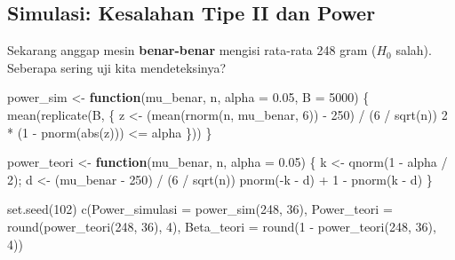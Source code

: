 \documentclass[
  indonesian,
  letterpaper,
]{book}
\newenvironment{Shaded}{\begin{snugshade}}{\end{snugshade}}
\newcommand{\AttributeTok}[1]{\textcolor[rgb]{0.40,0.45,0.13}{#1}}
\newcommand{\ControlFlowTok}[1]{\textcolor[rgb]{0.00,0.23,0.31}{\textbf{#1}}}
\newcommand{\DecValTok}[1]{\textcolor[rgb]{0.68,0.00,0.00}{#1}}
\newcommand{\FloatTok}[1]{\textcolor[rgb]{0.68,0.00,0.00}{#1}}
\newcommand{\FunctionTok}[1]{\textcolor[rgb]{0.28,0.35,0.67}{#1}}
\newcommand{\NormalTok}[1]{\textcolor[rgb]{0.00,0.23,0.31}{#1}}
\newcommand{\OtherTok}[1]{\textcolor[rgb]{0.00,0.23,0.31}{#1}}
\newcommand{\SpecialCharTok}[1]{\textcolor[rgb]{0.37,0.37,0.37}{#1}}
\begin{document}
\subsection{Simulasi: Kesalahan Tipe II dan
Power}\label{simulasi-kesalahan-tipe-ii-dan-power}

Sekarang anggap mesin \textbf{benar-benar} mengisi rata-rata 248 gram
(\(H_0\) salah). Seberapa sering uji kita mendeteksinya?

\begin{Shaded}
\begin{Highlighting}[]
\NormalTok{power\_sim }\OtherTok{\textless{}{-}} \ControlFlowTok{function}\NormalTok{(mu\_benar, n, }\AttributeTok{alpha =} \FloatTok{0.05}\NormalTok{, }\AttributeTok{B =} \DecValTok{5000}\NormalTok{) \{}
  \FunctionTok{mean}\NormalTok{(}\FunctionTok{replicate}\NormalTok{(B, \{}
\NormalTok{    z     }\OtherTok{\textless{}{-}}\NormalTok{ (}\FunctionTok{mean}\NormalTok{(}\FunctionTok{rnorm}\NormalTok{(n, mu\_benar, }\DecValTok{6}\NormalTok{)) }\SpecialCharTok{{-}} \DecValTok{250}\NormalTok{) }\SpecialCharTok{/}\NormalTok{ (}\DecValTok{6} \SpecialCharTok{/} \FunctionTok{sqrt}\NormalTok{(n))}
    \DecValTok{2} \SpecialCharTok{*}\NormalTok{ (}\DecValTok{1} \SpecialCharTok{{-}} \FunctionTok{pnorm}\NormalTok{(}\FunctionTok{abs}\NormalTok{(z))) }\SpecialCharTok{\textless{}=}\NormalTok{ alpha}
\NormalTok{  \}))}
\NormalTok{\}}

\NormalTok{power\_teori }\OtherTok{\textless{}{-}} \ControlFlowTok{function}\NormalTok{(mu\_benar, n, }\AttributeTok{alpha =} \FloatTok{0.05}\NormalTok{) \{}
\NormalTok{  k         }\OtherTok{\textless{}{-}} \FunctionTok{qnorm}\NormalTok{(}\DecValTok{1} \SpecialCharTok{{-}}\NormalTok{ alpha }\SpecialCharTok{/} \DecValTok{2}\NormalTok{); d }\OtherTok{\textless{}{-}}\NormalTok{ (mu\_benar }\SpecialCharTok{{-}} \DecValTok{250}\NormalTok{) }\SpecialCharTok{/}\NormalTok{ (}\DecValTok{6} \SpecialCharTok{/} \FunctionTok{sqrt}\NormalTok{(n))}
  \FunctionTok{pnorm}\NormalTok{(}\SpecialCharTok{{-}}\NormalTok{k }\SpecialCharTok{{-}}\NormalTok{ d) }\SpecialCharTok{+} \DecValTok{1} \SpecialCharTok{{-}} \FunctionTok{pnorm}\NormalTok{(k }\SpecialCharTok{{-}}\NormalTok{ d)}
\NormalTok{\}}

\FunctionTok{set.seed}\NormalTok{(}\DecValTok{102}\NormalTok{)}
\FunctionTok{c}\NormalTok{(}\AttributeTok{Power\_simulasi =} \FunctionTok{power\_sim}\NormalTok{(}\DecValTok{248}\NormalTok{, }\DecValTok{36}\NormalTok{), }\AttributeTok{Power\_teori =} \FunctionTok{round}\NormalTok{(}\FunctionTok{power\_teori}\NormalTok{(}\DecValTok{248}\NormalTok{, }\DecValTok{36}\NormalTok{), }\DecValTok{4}\NormalTok{),}
  \AttributeTok{Beta\_teori =} \FunctionTok{round}\NormalTok{(}\DecValTok{1} \SpecialCharTok{{-}} \FunctionTok{power\_teori}\NormalTok{(}\DecValTok{248}\NormalTok{, }\DecValTok{36}\NormalTok{), }\DecValTok{4}\NormalTok{))}
\end{Highlighting}
\end{Shaded}
\end{document}

